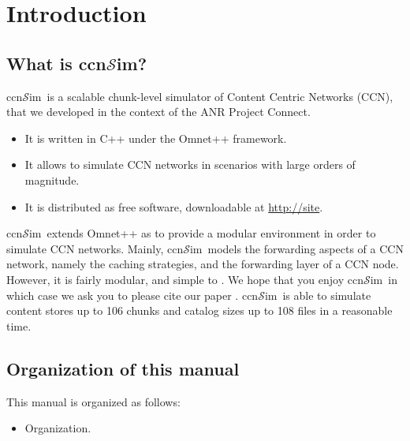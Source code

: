 \documentclass{article}
\newcommand{\ccnsim}{ccn$\mathcal{S}$im}
\begin{document}
\section{Introduction}
\subsection{What is \ccnsim?}
\ccnsim\ is a scalable chunk-level simulator of Content Centric Networks (CCN)\cite{jacobson09conext}, that we developed in the context of the ANR Project Connect.  

\begin{itemize}
    \item It is written in C++ under the Omnet++ framework.
    \item It  allows to simulate CCN networks in scenarios with large orders of magnitude.
    \item It is distributed as free software, downloadable at \url{http://site}.
\end{itemize}
\ccnsim\ extends Omnet++ as to provide a modular environment in order to simulate CCN networks. Mainly,  \ccnsim\ models the forwarding aspects of a CCN network, namely the caching strategies, and the forwarding layer of a CCN node. However, it is fairly modular, and simple to . We hope that you enjoy \ccnsim\, in which case we ask you to please cite our paper \cite{ccn12icc}. 
\ccnsim\ is able to simulate content stores up to 106 chunks and catalog sizes up to 108 files in a reasonable time.  
\subsection{Organization of this manual}
This manual is organized as follows:
\begin{itemize}
    \item Organization.
\end{itemize}
\end{document}
